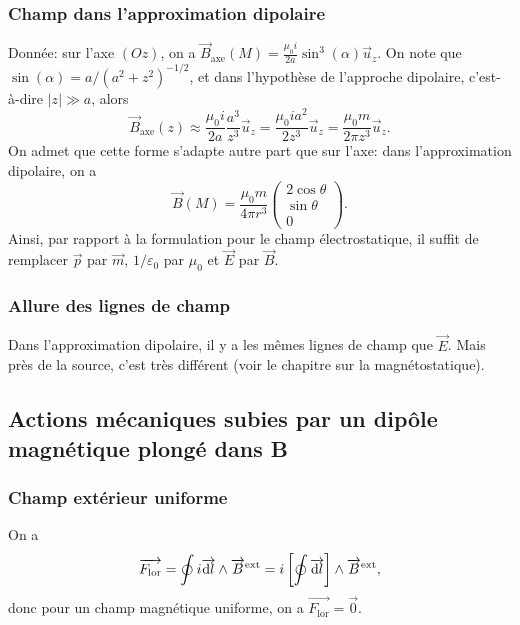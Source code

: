 \subsubsection{Champ dans l'approximation dipolaire}

Donnée: sur l'axe $(Oz)$, on a $\vec{B}_{\mathrm{axe}}(M)=\frac{\mu_0i}{2a}\sin^{3}(\alpha)\vec{u}_z$. On note que $\sin(\alpha)=a/(a^{2}+z^{2})^{-1/2}$, et dans l'hypothèse de l'approche dipolaire, c'est-à-dire $\left\lvert z\right\rvert\gg a$, alors
\begin{equation*}
    \vec{B}_{\mathrm{axe}}(z)\approx\frac{\mu_0i}{2a}\frac{a^{3}}{z^{3}}\vec{u}_z=\frac{\mu_0ia^{2}}{2z^{3}}\vec{u}_z=\frac{\mu_0 m}{2\pi z^{3}}\vec{u}_z.
\end{equation*}
On admet que cette forme s'adapte autre part que sur l'axe: dans l'approximation dipolaire, on a 
\begin{equation*}
    \boxed{
    \vec{B}(M)=\frac{\mu_0 m}{4\pi r^{3}}\begin{pmatrix}
        2\cos\theta\\\sin\theta\\0
    \end{pmatrix}
    .}
\end{equation*}
Ainsi, par rapport à la formulation pour le champ électrostatique, il suffit de remplacer $\vec{p}$ par $\vec{m}$, $1/\varepsilon_0$ par $\mu_0$ et $\vec{E}$ par $\vec{B}$.

\subsubsection{Allure des lignes de champ}
Dans l'approximation dipolaire, il y a les mêmes lignes de champ que $\vec{E}$. Mais près de la source, c'est très différent (voir le chapitre sur la magnétostatique).

\subsection[Actions mécaniques subies]{Actions mécaniques subies par un dipôle magnétique plongé dans B}
\subsubsection{Champ extérieur uniforme}
On a
\begin{equation*}
    \protect\overrightarrow{{F_{\mathrm{lor}}}}=\oint i\protect\overrightarrow{{\mathrm{d} l}}\wedge\protect\overrightarrow{{B}}^{\mathrm{ext}}=i\left[\oint\protect\overrightarrow{{\mathrm{d} l}}\right]\wedge\protect\overrightarrow{{B}}^{\mathrm{ext}},
\end{equation*}
donc pour un champ magnétique uniforme, on a $\vec{F_{\mathrm{lor}}}=\vec{0}$.

